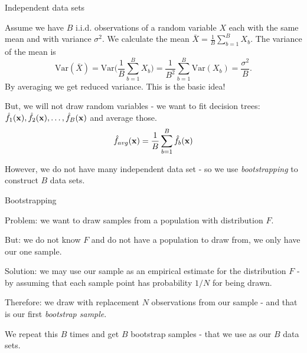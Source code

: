 \documentclass[
  ignorenonframetext,
]{beamer}
\begin{document}
\begin{frame}

\begin{block}{Independent data sets}

Assume we have \(B\) i.i.d. observations of a random variable \(X\) each
with the same mean and with variance \(\sigma^2\). We calculate the mean
\(\bar{X} = \frac{1}{B} \sum_{b=1}^B X_b\). The variance of the mean is
\[\text{Var}(\bar{X}) = \text{Var}\Big(\frac{1}{B}\sum_{b=1}^B X_b \Big) = \frac{1}{B^2} \sum_{b=1}^B \text{Var}(X_b) = \frac{\sigma^2}{B}.\]
By averaging we get reduced variance. This is the basic idea!

\end{block}

\end{frame}

\begin{frame}

But, we will not draw random variables - we want to fit decision trees:
\(\hat{f}_1({\bf x}),\hat{f}_2({\bf x}),\ldots, \hat{f}_B({\bf x})\) and
average those.
\[ \hat{f}_{avg}({\bf x})=\frac{1}{B}\sum_{b=1}^B \hat{f}_b({\bf x})\]

However, we do not have many independent data set - so we use
\emph{bootstrapping} to construct \(B\) data sets.

\end{frame}

\begin{frame}

\begin{block}{Bootstrapping}

Problem: we want to draw samples from a population with distribution
\(F\).

But: we do not know \(F\) and do not have a population to draw from, we
only have our one sample.

Solution: we may use our sample as an empirical estimate for the
distribution \(F\) - by assuming that each sample point has probability
\(1/N\) for being drawn.

Therefore: we draw with replacement \(N\) observations from our sample -
and that is our first \emph{bootstrap sample}.

We repeat this \(B\) times and get \(B\) bootstrap samples - that we use
as our \(B\) data sets.

\end{block}

\end{frame}
\end{document}
